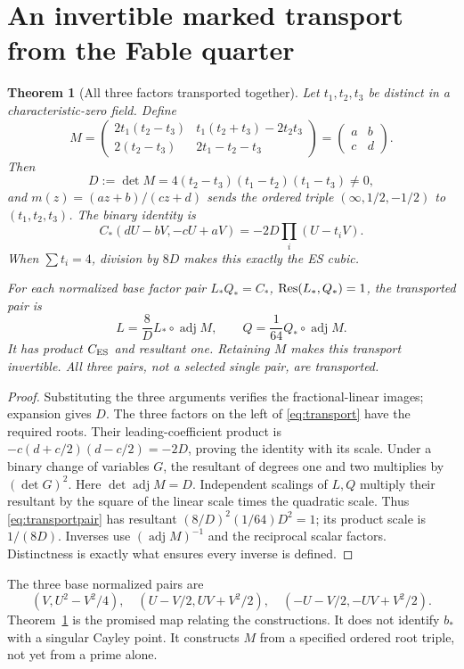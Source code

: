 \documentclass[11pt]{article}
\newtheorem{theorem}{Theorem}[section]
\theoremstyle{remark}\newtheorem{remark}[theorem]{Remark}
\begin{document}
\section{An invertible marked transport from the Fable quarter}
\begin{theorem}[All three factors transported together]\label{thm:mobius}
Let $t_1,t_2,t_3$ be distinct in a characteristic-zero field. Define
\begin{equation}\label{eq:M}
 M=\begin{pmatrix}
 2t_1(t_2-t_3)&t_1(t_2+t_3)-2t_2t_3\\
 2(t_2-t_3)&2t_1-t_2-t_3
 \end{pmatrix}
 =\begin{pmatrix}a&b\\c&d\end{pmatrix}.
\end{equation}
Then
\[
 D:=\det M=4(t_2-t_3)(t_1-t_2)(t_1-t_3)\ne0,
\]
and $m(z)=(az+b)/(cz+d)$ sends the ordered triple
$(\infty,1/2,-1/2)$ to $(t_1,t_2,t_3)$. The binary identity is
\begin{equation}\label{eq:transport}
 C_*(dU-bV,-cU+aV)
 =-2D\prod_i(U-t_iV).
\end{equation}
When $\sum t_i=4$, division by $8D$ makes this exactly the ES cubic.

For each normalized base factor pair $L_*Q_*=C_*$, $\operatorname{Res}(L_*,Q_*)=1$, the transported pair is
\begin{equation}\label{eq:transportpair}
 L=\frac8D L_*\circ\operatorname{adj}M,
 \qquad Q=\frac1{64}Q_*\circ\operatorname{adj}M.
\end{equation}
It has product $C_{\rm ES}$ and resultant one. Retaining $M$ makes this transport invertible. All three pairs, not a selected single pair, are transported.
\end{theorem}
\begin{proof}
Substituting the three arguments verifies the fractional-linear images; expansion gives $D$. The three factors on the left of \eqref{eq:transport} have the required roots. Their leading-coefficient product is
$-c(d+c/2)(d-c/2)=-2D$, proving the identity with its scale. Under a binary change of variables $G$, the resultant of degrees one and two multiplies by $(\det G)^2$. Here $\det\operatorname{adj}M=D$. Independent scalings of $L,Q$ multiply their resultant by the square of the linear scale times the quadratic scale. Thus \eqref{eq:transportpair} has resultant
$(8/D)^2(1/64)D^2=1$; its product scale is $1/(8D)$. Inverses use $ (\operatorname{adj}M)^{-1}$ and the reciprocal scalar factors. Distinctness is exactly what ensures every inverse is defined.
\end{proof}
The three base normalized pairs are
\[
 (V,U^2-V^2/4),\quad(U-V/2,UV+V^2/2),\quad(-U-V/2,-UV+V^2/2).
\]
Theorem~\ref{thm:mobius} is the promised map relating the constructions. It does not identify $b_*$ with a singular Cayley point. It constructs $M$ from a specified ordered root triple, not yet from a prime alone.
\end{document}
